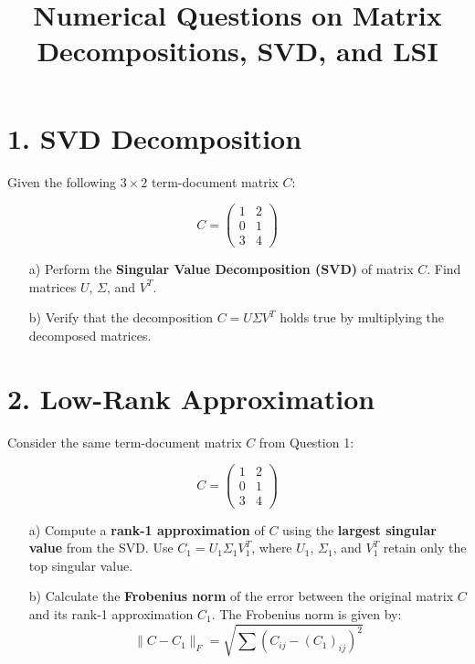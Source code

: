 \documentclass{article}
\title{Numerical Questions on Matrix Decompositions, SVD, and LSI}
\date{}
\begin{document}
\maketitle

\section*{1. SVD Decomposition}

Given the following \( 3 \times 2 \) term-document matrix \( C \):

\[
C = \begin{pmatrix}
1 & 2 \\
0 & 1 \\
3 & 4
\end{pmatrix}
\]

\begin{enumerate}
    \item[a)] Perform the \textbf{Singular Value Decomposition (SVD)} of matrix \( C \). Find matrices \( U \), \( \Sigma \), and \( V^T \).
    \item[b)] Verify that the decomposition \( C = U \Sigma V^T \) holds true by multiplying the decomposed matrices.
\end{enumerate}

\section*{2. Low-Rank Approximation}

Consider the same term-document matrix \( C \) from Question 1:

\[
C = \begin{pmatrix}
1 & 2 \\
0 & 1 \\
3 & 4
\end{pmatrix}
\]

\begin{enumerate}
    \item[a)] Compute a \textbf{rank-1 approximation} of \( C \) using the \textbf{largest singular value} from the SVD. Use \( C_1 = U_1 \Sigma_1 V_1^T \), where \( U_1 \), \( \Sigma_1 \), and \( V_1^T \) retain only the top singular value.
    \item[b)] Calculate the \textbf{Frobenius norm} of the error between the original matrix \( C \) and its rank-1 approximation \( C_1 \). The Frobenius norm is given by:
    \[
    \| C - C_1 \|_F = \sqrt{\sum (C_{ij} - (C_1)_{ij})^2 }
    \]
\end{enumerate}
\end{document}
